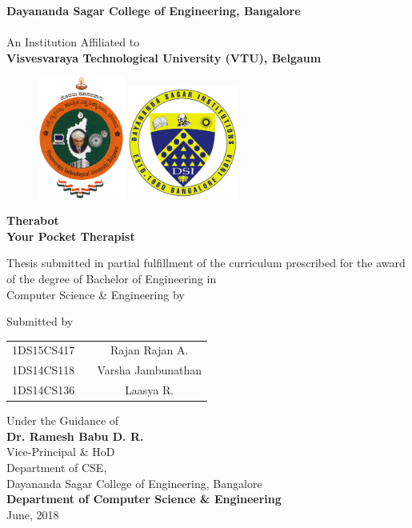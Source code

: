 \begin{titlingpage}

\thispagestyle{empty}
\centering

\setlength{\toptafiddle}{1in}
\setlength{\bottafiddle}{1in}

\vspace*{-0.75in}
\enlargethispage{\toptafiddle}

\textbf{Dayananda Sagar College of Engineering, Bangalore}\\
\hspace{0.1cm}\\
An Institution Affiliated to\\
\textbf{Visvesvaraya Technological University (VTU), Belgaum}\\
\vspace{0.2cm}

\begin{figure}[h]
    \centering
    \includegraphics[height=4cm]{images/vtu.png}
    \hspace{0.1\textwidth}
    \includegraphics[height=3.7cm]{images/dsi.png}
\end{figure}

\vfill
\Huge{\textbf{\textcolor{therablue}{Therabot}}}\\
\Large{\textbf{Your Pocket Therapist}}
\vfill

\large Thesis submitted in partial fulfillment of the curriculum
prescribed for the award of the degree of Bachelor of Engineering
in \\Computer Science \& Engineering by\vfill

Submitted by\\
\begin{tabular}{ccc}
1DS15CS417 &  & Rajan Rajan A.\\
1DS14CS118 &  & Varsha Jambunathan\\
1DS14CS136 &  & Laasya R.\\
\end{tabular}
\vfill

Under the Guidance of\\
\Large{\textbf{Dr. Ramesh Babu D. R.}}\\
\large{Vice-Principal \& HoD}\\
Department of CSE,\\
Dayananda Sagar College of Engineering, Bangalore\\
\vfill
\textbf{Department of Computer Science \& Engineering}\\
June, 2018

\end{titlingpage}
